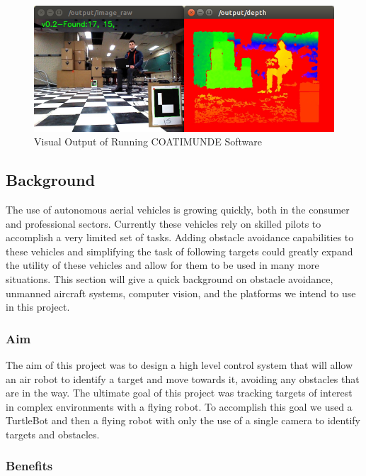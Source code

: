 \documentclass{article}[12]
\begin{document}
	\begin{figure}[]
		\centering
		\includegraphics[width=0.95\linewidth]{results}
		\caption{Visual Output of Running COATIMUNDE Software}
		\label{fig:prettyresultsimage}
	\end{figure}
	
	\subsection{Background}
	
	The use of autonomous aerial vehicles is growing quickly, both in the consumer and professional sectors. Currently these vehicles rely on skilled pilots to accomplish a very limited set of tasks. Adding obstacle avoidance capabilities to these vehicles and simplifying the task of following targets could greatly expand the utility of these vehicles and allow for them to be used in many more situations. This section will give a quick background on obstacle avoidance, unmanned aircraft systems, computer vision, and the platforms we intend to use in this project.

		\subsubsection{Aim}
	
		The aim of this project was to design a high level control system that will allow an air robot to identify a target and move towards it, avoiding any obstacles that are in the way. The ultimate goal of this project was tracking targets of interest in complex environments with a flying robot. To accomplish this goal we used a TurtleBot and then a flying robot with only the use of a single camera to identify targets and obstacles. 
		
		\subsubsection{Benefits}
		
\end{document}
